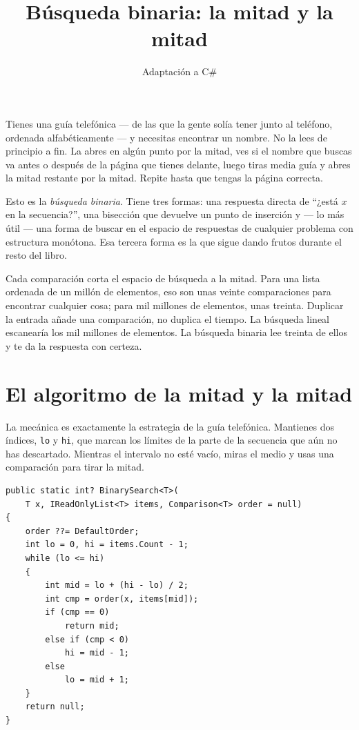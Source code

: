 \documentclass[11pt,a4paper]{article}
\title{Búsqueda binaria: la mitad y la mitad}
\author{Adaptación a C\#}
\date{}
\begin{document}
\maketitle

Tienes una guía telefónica --- de las que la gente solía tener junto al teléfono, ordenada alfabéticamente --- y necesitas encontrar un nombre. No la lees de principio a fin. La abres en algún punto por la mitad, ves si el nombre que buscas va antes o después de la página que tienes delante, luego tiras media guía y abres la mitad restante por la mitad. Repite hasta que tengas la página correcta.

Esto es la \emph{búsqueda binaria}. Tiene tres formas: una respuesta directa de ``¿está $x$ en la secuencia?'', una bisección que devuelve un punto de inserción y --- lo más útil --- una forma de buscar en el espacio de respuestas de cualquier problema con estructura monótona. Esa tercera forma es la que sigue dando frutos durante el resto del libro.

Cada comparación corta el espacio de búsqueda a la mitad. Para una lista ordenada de un millón de elementos, eso son unas veinte comparaciones para encontrar cualquier cosa; para mil millones de elementos, unas treinta. Duplicar la entrada añade una comparación, no duplica el tiempo. La búsqueda lineal escanearía los mil millones de elementos. La búsqueda binaria lee treinta de ellos y te da la respuesta con certeza.

\section{El algoritmo de la mitad y la mitad}

La mecánica es exactamente la estrategia de la guía telefónica. Mantienes dos índices, \texttt{lo} y \texttt{hi}, que marcan los límites de la parte de la secuencia que aún no has descartado. Mientras el intervalo no esté vacío, miras el medio y usas una comparación para tirar la mitad.

\begin{lstlisting}[caption={Búsqueda binaria iterativa}]
public static int? BinarySearch<T>(
    T x, IReadOnlyList<T> items, Comparison<T> order = null)
{
    order ??= DefaultOrder;
    int lo = 0, hi = items.Count - 1;
    while (lo <= hi)
    {
        int mid = lo + (hi - lo) / 2;
        int cmp = order(x, items[mid]);
        if (cmp == 0)
            return mid;
        else if (cmp < 0)
            hi = mid - 1;
        else
            lo = mid + 1;
    }
    return null;
}
\end{lstlisting}
\end{document}
